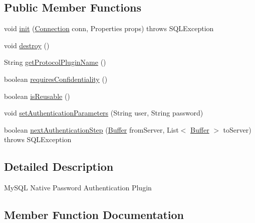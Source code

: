 \subsection*{Public Member Functions}
\begin{DoxyCompactItemize}
\item 
void \mbox{\hyperlink{classcom_1_1mysql_1_1jdbc_1_1authentication_1_1_mysql_native_password_plugin_a83b8e09be039f698b142aa365daf1de6}{init}} (\mbox{\hyperlink{interfacecom_1_1mysql_1_1jdbc_1_1_connection}{Connection}} conn, Properties props)  throws S\+Q\+L\+Exception 
\item 
void \mbox{\hyperlink{classcom_1_1mysql_1_1jdbc_1_1authentication_1_1_mysql_native_password_plugin_aaa2f2af253ec6d2ef6139600c0f1d969}{destroy}} ()
\item 
String \mbox{\hyperlink{classcom_1_1mysql_1_1jdbc_1_1authentication_1_1_mysql_native_password_plugin_a864fdbd1fc6282bfdf04805cd059d46b}{get\+Protocol\+Plugin\+Name}} ()
\item 
boolean \mbox{\hyperlink{classcom_1_1mysql_1_1jdbc_1_1authentication_1_1_mysql_native_password_plugin_a5707e2d872d4896e516660d572301c96}{requires\+Confidentiality}} ()
\item 
boolean \mbox{\hyperlink{classcom_1_1mysql_1_1jdbc_1_1authentication_1_1_mysql_native_password_plugin_aa11ae323c22a910cd0cd6a1e904ff458}{is\+Reusable}} ()
\item 
void \mbox{\hyperlink{classcom_1_1mysql_1_1jdbc_1_1authentication_1_1_mysql_native_password_plugin_a99b07a97f92e7f3cf6e71712eb975613}{set\+Authentication\+Parameters}} (String user, String password)
\item 
boolean \mbox{\hyperlink{classcom_1_1mysql_1_1jdbc_1_1authentication_1_1_mysql_native_password_plugin_af91bb791cd53bd81559d8101f962618f}{next\+Authentication\+Step}} (\mbox{\hyperlink{classcom_1_1mysql_1_1jdbc_1_1_buffer}{Buffer}} from\+Server, List$<$ \mbox{\hyperlink{classcom_1_1mysql_1_1jdbc_1_1_buffer}{Buffer}} $>$ to\+Server)  throws S\+Q\+L\+Exception 
\end{DoxyCompactItemize}


\subsection{Detailed Description}
My\+S\+QL Native Password Authentication Plugin 

\subsection{Member Function Documentation}
\mbox{\label{classcom_1_1mysql_1_1jdbc_1_1authentication_1_1_mysql_native_password_plugin_aaa2f2af253ec6d2ef6139600c0f1d969}} 
